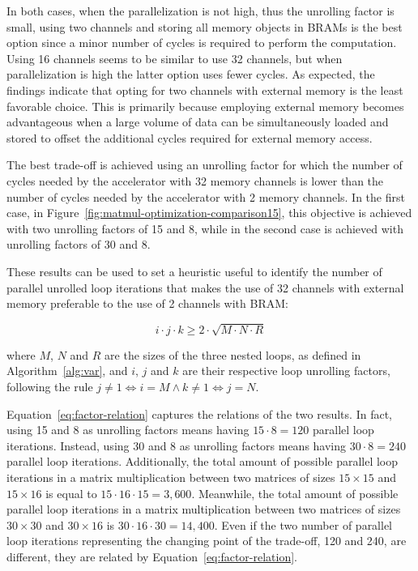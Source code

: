 In both cases, when the parallelization is not high, thus the unrolling factor is small, using two channels and storing all memory objects in BRAMs is the best option since a minor number of cycles is required to perform the computation.
Using 16 channels seems to be similar to use 32 channels, but when parallelization is high the latter option uses fewer cycles.
As expected, the findings indicate that opting for two channels with external memory is the least favorable choice.
This is primarily because employing external memory becomes advantageous when a large volume of data can be simultaneously loaded and stored to offset the additional cycles required for external memory access.

The best trade-off is achieved using an unrolling factor for which the number of cycles needed by the accelerator with 32 memory channels is lower than the number of cycles needed by the accelerator with 2 memory channels.
In the first case, in Figure~\ref{fig:matmul-optimization-comparison15}, this objective is achieved with two unrolling factors of 15 and 8, while in the second case is achieved with unrolling factors of 30 and 8.

These results can be used to set a heuristic useful to identify the number of parallel unrolled loop iterations that makes the use of 32 channels with external memory preferable to the use of 2 channels with BRAM:

\begin{equation}
    \label{eq:factor-relation}
        i \cdot j \cdot k \geq 2 \cdot \sqrt {M \cdot N \cdot R}
\end{equation}

where $M$, $N$ and $R$ are the sizes of the three nested loops, as defined in Algorithm~\ref{alg:var}, and $i$, $j$ and $k$ are their respective loop unrolling factors, following the rule $j \neq 1 \iff i=M \land k \neq 1 \iff j=N$.

Equation~\ref{eq:factor-relation} captures the relations of the two results.
In fact, using 15 and 8 as unrolling factors means having $15 \cdot 8 = 120$ parallel loop iterations.
Instead, using 30 and 8 as unrolling factors means having $30 \cdot 8 = 240$ parallel loop iterations.
Additionally, the total amount of possible parallel loop iterations in a matrix multiplication between two matrices of sizes $15\times15$ and $15\times16$ is equal to $15 \cdot 16 \cdot 15 = 3,600$.
Meanwhile, the total amount of possible parallel loop iterations in a matrix multiplication between two matrices of sizes $30\times30$ and $30\times16$ is $30 \cdot 16 \cdot 30 = 14,400$.
Even if the two number of parallel loop iterations representing the changing point of the trade-off, 120 and 240, are different, they are related by Equation~\ref{eq:factor-relation}.

